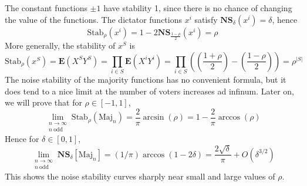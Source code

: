 \begin{example}
    The constant functions $\pm 1$ have stability 1, since there is no chance of changing the value of the functions. The dictator functions $x^i$ satisfy $\mathbf{NS}_\delta(x^i) = \delta$, hence
    \[ \text{Stab}_\rho(x^i) = 1 - 2 \mathbf{NS}_{\frac{1 - \rho}{2}}(x^i) = \rho \]
    More generally, the stability of $x^S$ is
    \[ \text{Stab}_\rho(x^S) = \mathbf{E}(X^SY^S) = \prod_{i \in S} \mathbf{E}(X^iY^i) = \prod_{i \in S} \left( \left( \frac{1 + \rho}{2} \right) - \left( \frac{1 - \rho}{2} \right) \right) = \rho^{|S|} \]
    The noise stability of the majority functions has no convenient formula, but it does tend to a nice limit at the number of voters increases ad infinum. Later on, we will prove that for $\rho \in [-1,1]$,
    \[ \lim_{\substack{n \to \infty\\n\ \text{odd}}} \text{Stab}_\rho(\text{Maj}_n) = \frac{2}{\pi} \arcsin(\rho) = 1 - \frac{2}{\pi} \arccos(\rho) \]
    Hence for $\delta \in [0,1]$,
    \[ \lim_{\substack{n \to \infty\\n\ \text{odd}}} \mathbf{NS}_\delta[\text{Maj}_n] = (1/\pi) \arccos(1 - 2 \delta) = \frac{2\sqrt{\delta}}{\pi} + O(\delta^{3/2}) \]
    This shows the noise stability curves sharply near small and large values of $\rho$.
\end{example}

